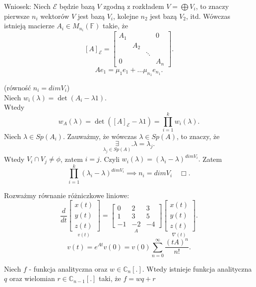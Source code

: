 \documentclass[../main.tex]{subfiles}
\begin{document}
    Wniosek: Niech $\mathcal{E}$ będzie bazą $V$ zgodną z rozkładem $V = \bigoplus V_i$, to znaczy pierwsze $n_i$ wektorów $V$ jest bazą $V_i$, kolejne $n_2$ jest bazą $V_2$, itd. Wówczas istnieją macierze $A_i\in M_{n_i}(\mathbb{F})$ takie, że
    \[
        [A]_\mathcal{E} = \begin{bmatrix} A_1&&&0\\ &A_2&\\ &&\ddots&\\ 0&&&A_n \end{bmatrix}
    .\]
    \[
    A e_1 = \mu_1e_1 + \ldots \mu_{n_1}e_{n_1}
    .\]
    \begin{dowod}
        (równość $n_i = dim V_i$)\\
        Niech $w_i(\lambda) = \det (A_i - \lambda 1).$\\
        Wtedy
        \[
         w_A(\lambda) = \det ([A]_\mathcal{E} - \lambda 1) =
        \prod_{i=1}^{k} w_i(\lambda)
        .\]
        Niech $\lambda\in Sp(A_i).$ Zauważmy, że wówczas $\lambda\in Sp(A)$, to znaczy, że
        \[
            \underset{\lambda_j\in Sp(A)}{\exists}. \lambda = \lambda_j
        .\]
        Wtedy $V_i \cap V_j \neq \phi$, zatem $i =j$. Czyli $w_i(\lambda) = (\lambda_i - \lambda)^{dim V_i}.$ Zatem
        \[
            \prod_{i=1}^{k} (\lambda_i - \lambda)^{dim V_i} \implies n_i = dim V_i\quad\Box
        .\]
    \end{dowod}
    \begin{przyklad}
        Rozważmy równanie różniczkowe liniowe:
        \[
            \frac{d}{dt} \underset{v(t)}{\begin{bmatrix} x(t)\\y(t)\\z(t) \end{bmatrix}} =
            \underset{A}{\begin{bmatrix} 0&2&3\\1&3&5\\-1&-2&-4 \end{bmatrix}} \underset{\nabla(t)}{\begin{bmatrix} x(t)\\y(t)\\z(t) \end{bmatrix}}
        .\]
        \[
            v(t) = e^{A t}v(0) = v(0) \sum_{n=0}^{\infty} \frac{(t A)^n}{n!}
        .\]
    \end{przyklad}
    \begin{stw}
        Niech $f$ - funkcja analityczna oraz $w\in \mathbb{C}_n [.]$. Wtedy istnieje funkcja analityczna $q$ oraz wielomian $r\in\mathbb{C}_{n-1}[.]$ taki, że $f = wq + r$
    \end{stw}
\end{document}
